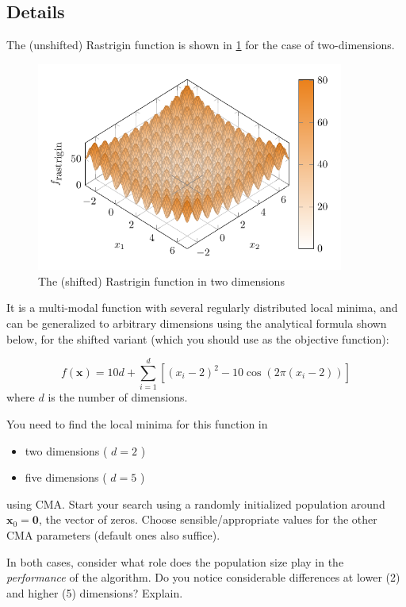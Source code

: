 \documentclass[11pt]{article}
\begin{document}
\subsection{Details}
\label{sec:orgffb5715}
The (unshifted) Rastrigin function is shown in \cref{rastr} for the case of two-dimensions.

\begin{figure}[htbp]
\centering
\includegraphics[width=0.9\textwidth]{images/shifted_rastrigin.pdf}
\caption{\label{rastr}The (shifted) Rastrigin function in two dimensions}
\end{figure}


It is a multi-modal function with several regularly distributed local minima,
and can be generalized to arbitrary dimensions using the analytical formula
shown below, for the shifted variant (which you should use as the objective
function):

\begin{equation}
f(\mathbf{x}) = 10d + \sum_{i=1}^{d} \left[ (x_i - 2)^2 - 10 \cos\left(2 \pi (x_i - 2) \right) \right]
\end{equation}
where \(d\) is the number of dimensions.


You need to find the local minima for this function in
\begin{itemize}
\item two dimensions ( \(d = 2\) )
\item five dimensions ( \(d = 5\) )
\end{itemize}
using CMA. Start your search using a randomly initialized population around \(\mathbf{x}_0 = \mathbf{0}\), the vector of zeros. Choose sensible/appropriate values for
the other CMA parameters (default ones also suffice).

In both cases, consider what role does the population size play in the
\emph{performance} of the algorithm. Do you notice considerable differences at lower
(2) and higher (5) dimensions? Explain.
\end{document}
